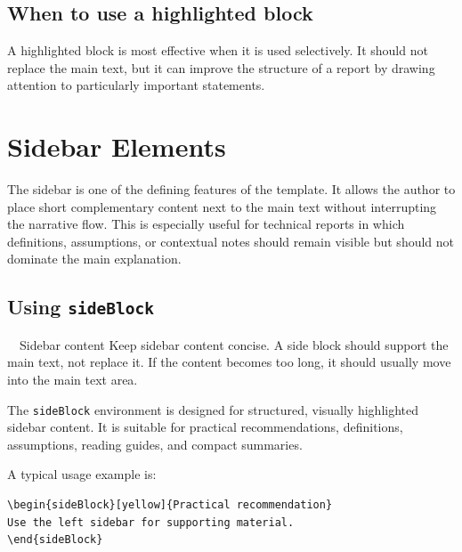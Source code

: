 \documentclass[11pt,a4paper]{report}
\begin{document}
\section{When to use a highlighted block}

A highlighted block is most effective when it is used selectively. It should not replace the main text, but it can improve the structure of a report by drawing attention to particularly important statements.

\clearpage


\chapter{Sidebar Elements}

The sidebar is one of the defining features of the template. It allows the author to place short complementary content next to the main text without interrupting the narrative flow. This is especially useful for technical reports in which definitions, assumptions, or contextual notes should remain visible but should not dominate the main explanation.

\section{Using \texttt{sideBlock}}

\begin{sideBlock}[yellow]{~~Sidebar content}
Keep sidebar content concise. A side block should support the main text, not replace it. If the content becomes too long, it should usually move into the main text area.
\end{sideBlock}

The \texttt{sideBlock} environment is designed for structured, visually highlighted sidebar content. It is suitable for practical recommendations, definitions, assumptions, reading guides, and compact summaries.

A typical usage example is:

\begin{coloredBlock}[grey]{}
\begin{verbatim}
\begin{sideBlock}[yellow]{Practical recommendation}
Use the left sidebar for supporting material.
\end{sideBlock}
\end{verbatim}
\end{coloredBlock}
\end{document}
